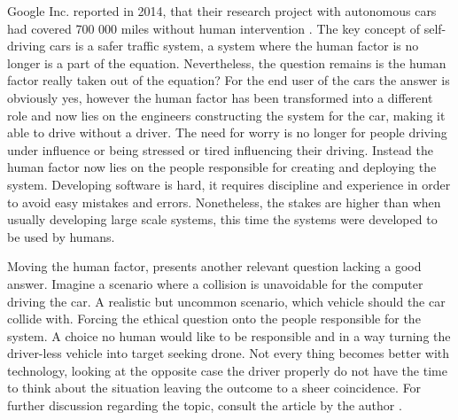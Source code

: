 Google Inc. reported in 2014, that their research project with autonomous cars had covered 700 000 miles without human intervention \parencite{Urmson2014:Online}. The key concept of self-driving cars is a safer traffic system, a system where the human factor is no longer is a part of the equation. Nevertheless, the question remains is the human factor really taken out of the equation? For the end user of the cars the answer is obviously yes, however the human factor has been transformed into a different role and now lies on the engineers constructing the system for the car, making it able to drive without a driver. The need for worry is no longer for people driving under influence or being stressed or tired influencing their driving. Instead the human factor now lies on the people responsible for creating and deploying the system. Developing software is hard, it requires discipline and experience in order to avoid easy mistakes and errors. Nonetheless, the stakes are higher than when usually developing large scale systems, this time the systems were developed to be used by humans. 

Moving the human factor, presents another relevant question lacking a good answer. Imagine a scenario where a collision is unavoidable for the computer driving the car. A realistic but uncommon scenario, which vehicle should the car collide with. Forcing the ethical question onto the people responsible for the system. A choice no human would like to be responsible and in a way turning the driver-less vehicle into target seeking drone. Not every thing becomes better with technology, looking at the opposite case the driver properly do not have the time to think about the situation leaving the outcome to a sheer coincidence. For further discussion regarding the topic, consult the article by the author \parencite{Lin:Online}.